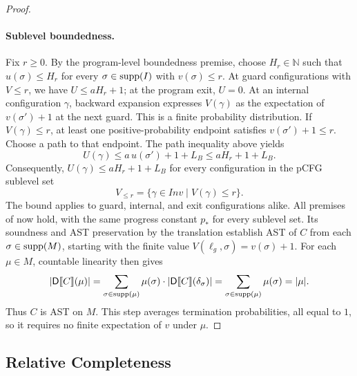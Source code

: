 \begin{proof}
\paragraph{Sublevel boundedness.}
Fix $r\geq0$. By the program-level boundedness premise, choose
$H_r\in\mathbb N$ such that $u(\sigma)\leq H_r$ for every
$\sigma\in\textnormal{supp}(I)$ with $v(\sigma)\leq r$.
At guard configurations with $V\leq r$, we have $U\leq aH_r+1$;
at the program exit, $U=0$. At an internal configuration $\gamma$,
backward expansion expresses $V(\gamma)$ as the expectation of
$v(\sigma')+1$ at the next guard. This is a finite probability
distribution. If $V(\gamma)\leq r$, at least one positive-probability
endpoint satisfies $v(\sigma')+1\leq r$. Choose a path to that endpoint.
The path inequality above yields
\[
 U(\gamma)\leq a\,u(\sigma')+1+L_B\leq aH_r+1+L_B.
\]
Consequently, $U(\gamma)\leq aH_r+1+L_B$ for every configuration in
the pCFG sublevel set
\[
 V_{\leq r}=\{\gamma\in\mathit{Inv}\mid V(\gamma)\leq r\}.
\]
The bound applies to guard, internal, and exit configurations alike.
All premises of  now hold,
with the same progress constant $p_*$ for every sublevel set. Its
soundness and AST preservation by the translation establish AST of
$C$ from each $\sigma\in\textnormal{supp}(M)$, starting with the finite value
$V(\ell_g,\sigma)=v(\sigma)+1$.
For each $\mu\in M$, countable linearity then gives
\[
 |\mathsf{D}\llbracket C\rrbracket(\mu)|
 =\sum_{\sigma\in\textnormal{supp}(\mu)}\mu(\sigma)\cdot
       |\mathsf{D}\llbracket C\rrbracket(\delta_{\sigma})|
 =\sum_{\sigma\in\textnormal{supp}(\mu)}\mu(\sigma)=|\mu|.
\]
Thus $C$ is AST on $M$. This step averages termination probabilities,
all equal to $1$, so it requires no finite expectation of $v$ under $\mu$.
\end{proof}

\subsection{Relative Completeness}
\label{sec:relative-completeness}

